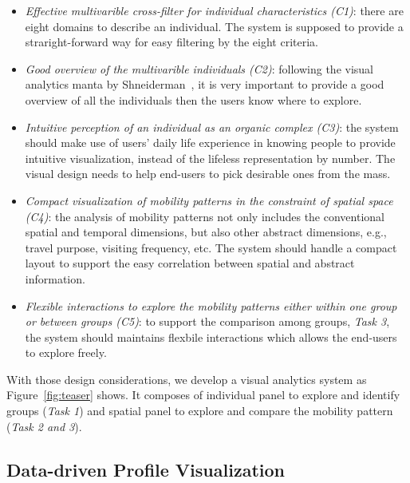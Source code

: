 \begin{itemize}
\item \textit{Effective multivarible cross-filter for individual characteristics (C1)}: there are eight domains to describe an individual. The system is supposed to provide a straright-forward way for easy filtering by the eight criteria.
\item \textit{Good overview of the multivarible individuals (C2)}: following the visual analytics manta by Shneiderman~\cite{RN459}, it is very important to provide a good overview of all the individuals then the users know where to explore. 
\item \textit{Intuitive perception of an individual as an organic complex (C3)}: the system should make use of users' daily life experience in knowing people to provide intuitive visualization, instead of the lifeless representation by number. The visual design needs to help end-users to pick desirable ones from the mass.  
\item \textit{Compact visualization of mobility patterns in the constraint of spatial space (C4)}: the analysis of mobility patterns not only includes the conventional spatial and temporal dimensions, but also other abstract dimensions, e.g., travel purpose, visiting frequency, etc. The system should handle a compact layout to support the easy correlation between spatial and abstract information. 
\item \textit{Flexible interactions to explore the mobility patterns either within one group or between groups (C5)}: to support the comparison among groups, \textit{Task 3}, the system should maintains flexbile interactions which allows the end-users to explore freely.
\end{itemize}


With those design considerations, we develop a visual analytics system as Figure~\ref{fig:teaser} shows. It composes of individual panel to explore and identify groups (\textit{Task 1}) and spatial panel to explore and compare the mobility pattern (\textit{Task 2 and 3}). 

\subsection{Data-driven Profile Visualization}

